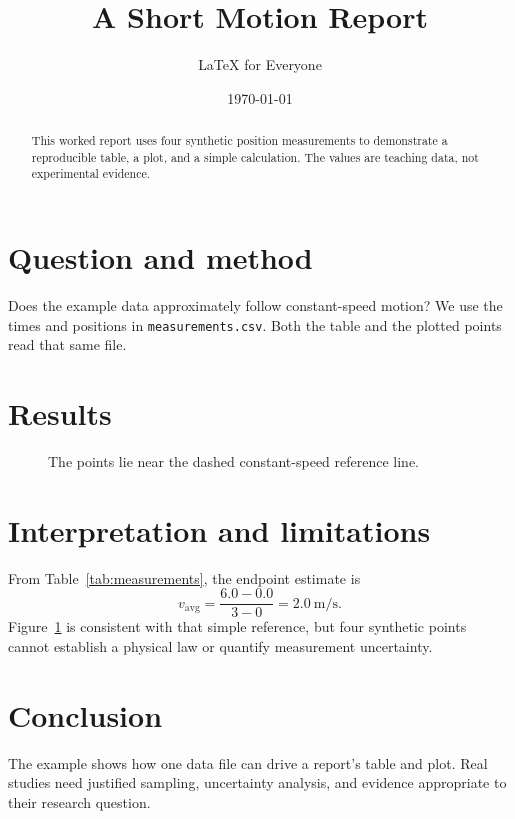 \documentclass[11pt]{article}
\title{A Short Motion Report}
\author{LaTeX for Everyone}
\date{\today}
\begin{document}
\maketitle
\begin{abstract}
This worked report uses four synthetic position measurements to
demonstrate a reproducible table, a plot, and a simple calculation.
The values are teaching data, not experimental evidence.
\end{abstract}

\section{Question and method}
Does the example data approximately follow constant-speed motion?
We use the times and positions in \texttt{measurements.csv}. Both
the table and the plotted points read that same file.

\section{Results}
\begin{table}[htbp]
  \centering
  \caption{Synthetic positions recorded at one-second intervals.}
  \label{tab:measurements}
\end{table}

\begin{figure}[htbp]
  \centering
  \caption{The points lie near the dashed constant-speed reference line.}
  \label{fig:motion}
\end{figure}

\section{Interpretation and limitations}
From Table~\ref{tab:measurements}, the endpoint estimate is
\[
  v_{\mathrm{avg}}=\frac{6.0-0.0}{3-0}
    =\qty{2.0}{\metre\per\second}.
\]
Figure~\ref{fig:motion} is consistent with that simple reference,
but four synthetic points cannot establish a physical law or
quantify measurement uncertainty.

\section{Conclusion}
The example shows how one data file can drive a report's table
and plot. Real studies need justified sampling, uncertainty analysis,
and evidence appropriate to their research question.
\end{document}

